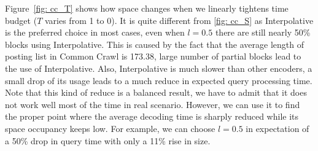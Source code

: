 \documentclass{sig-alternate-05-2015}
\begin{document}
Figure~\ref{fig: cc_T} shows how space changes when we linearly tightens time budget ($ T $ varies from 1 to 0).
It is quite different from \ref{fig: cc_S} as Interpolative is the preferred choice in most cases, even when $ l = 0.5 $ there are still nearly 50\% blocks using Interpolative.
This is caused by the fact that the average length of posting list in Common Crawl is 173.38, large number of partial blocks lead to the use of Interpolative.
Also, Interpolative is much slower than other encoders, a small drop of its usage leads to a much reduce in expected query processing time.
Note that this kind of reduce is a balanced result, we have to admit that it does not work well most of the time in real scenario.
However, we can use it to find the proper point where the average decoding time is sharply reduced while its space occupancy keeps low.
For example, we can choose $ l=0.5 $ in expectation of a 50\% drop in query time with only a 11\% rise in size.
\end{document}
